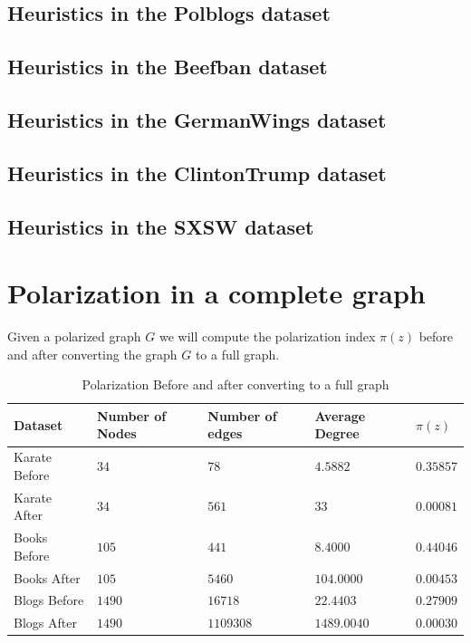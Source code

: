 \subsection{Heuristics in the Polblogs dataset}
\subsection{Heuristics in the Beefban dataset}
\subsection{Heuristics in the GermanWings dataset}
\subsection{Heuristics in the ClintonTrump dataset}
\subsection{Heuristics in the SXSW dataset}




\section{Polarization in a complete graph}
\label{sec:fullgraph}
\vspace{20pt}
Given a polarized graph $G$ we will compute the polarization index $\pi(z)$ before and after converting the graph $G$ to a full graph. 

\begin{table}[!htbp]
 \centering
 \caption{Polarization Before and after converting to a full graph}
 \label{tab:fullgraph}
 \begin{tabular}{| l || l | l | l | l |}
 \hline
  Dataset & Number of Nodes & Number of edges & Average Degree & $\pi(z)$\\
  \hline
  \hline
  Karate Before & $34$ & $78$ & $4.5882$ &  $0.35857$\\
  \hline
  Karate After & $34$ & $561$ & $33$ &  $0.00081$\\
  \hline
  \hline
  Books Before & $105$ & $441$ & $8.4000$ &  $0.44046$\\
  \hline
  Books After & $105$ & $5460$ & $104.0000$ &  $0.00453$\\
  \hline
  \hline
  Blogs Before & $1490$ & $16718$ & $22.4403$ &  $0.27909$\\
  \hline
  Blogs After & $1490$ & $1109308$ & $1489.0040$ &  $0.00030$\\
  \hline
 \end{tabular}
 \end{table}


